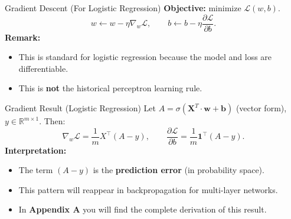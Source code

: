 \documentclass[aspectratio=169]{beamer}
\begin{document}
%
%
\begin{frame}{Gradient Descent (For Logistic Regression)}
\textbf{Objective:} minimize $\mathcal{L}(w,b)$.
\[
w \leftarrow w - \eta \nabla_w \mathcal{L},
\qquad
b \leftarrow b - \eta \frac{\partial \mathcal{L}}{\partial b}.
\]
\textbf{Remark:}
\begin{itemize}
  \item This is standard for logistic regression because the model and loss are differentiable.
  \item This is \textbf{not} the historical perceptron learning rule.
\end{itemize}
\end{frame}
%
%
\begin{frame}{Gradient Result (Logistic Regression)}
Let $A = \sigma(\mathbf{X}^T \cdot \mathbf{w} + \mathbf{b})$ (vector form), $y\in\mathbb{R}^{m\times 1}$.
Then:
\[
\nabla_w \mathcal{L} = \frac{1}{m}X^\top(A-y),
\qquad
\frac{\partial \mathcal{L}}{\partial b} = \frac{1}{m}\mathbf{1}^\top(A-y).
\]
\textbf{Interpretation:}
\begin{itemize}
  \item The term $(A-y)$ is the \textbf{prediction error} (in probability space).
  \item This pattern will reappear in backpropagation for multi-layer networks.
  \item In \textbf{Appendix A} you will find the complete derivation of this result.
\end{itemize}
\end{frame}
%
\end{document}
